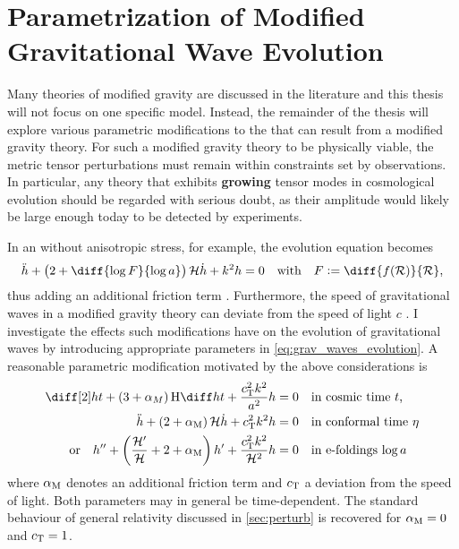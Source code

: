 \documentclass[parskip=half]{scrreprt}
\begin{document}



\chapter{Parametrization of Modified Gravitational Wave Evolution}

Many theories of modified gravity are discussed in the literature  and this thesis will not focus on one specific model. Instead, the remainder of the thesis will explore various parametric modifications to the  that can result from a modified gravity theory. For such a modified gravity theory to be physically viable, the metric tensor perturbations must remain within constraints set by observations. In particular, any theory that exhibits \textbf{growing} tensor modes in cosmological evolution should be regarded with serious doubt, as their amplitude would likely be large enough today to be detected by experiments.

In an  without anisotropic stress, for example, the evolution equation becomes
\begin{equation}
	\ddconf{h} + \del{2 + \diff{\log{F}}{\efold}} \Hconf \dconf{h} + k^2 h = 0 \quad \text{with} \quad F \defeq \diff{f(\Rscal)}{\Rscal} \eqpunct{,}
\end{equation}
thus adding an additional friction term \citep{Xu2015}. Furthermore, the speed of gravitational waves in a modified gravity theory can deviate from the speed of light \(c\) \citep{Amendola2014,Raveri2014}. I investigate the effects such modifications have on the evolution of gravitational waves by introducing appropriate parameters in \eqref{eq:grav_waves_evolution}. A reasonable parametric modification motivated by the above considerations is
\begin{subequations}\label{eq:evolution_friction}
\begin{align}
	\ddt{h} + \del{3 + \alpha_M} \Hcosm \dt{h} + \frac{\cT^2 k^2}{a^2} h &= 0 \quad \text{in cosmic time \(t\),} \\
	\ddconf{h} + \del{2 + \alphaM} \Hconf \dconf{h} + \cT^2 k^2 h &= 0 \quad \text{in conformal time \(\conft\)} \\
    \text{or} \quad \ddefold{h} + \del{\frac{\defold{\Hconf}}{\Hconf} + 2 + \alphaM} \defold{h} + \frac{\cT^2 k^2}{\Hconf^2} h &= 0 \quad \text{in e-foldings \(\efold\)}
\end{align}
\end{subequations}
where \(\alpha_\mathrm{M}\) denotes an additional friction term and \(c_\mathrm{T}\) a deviation from the speed of light. Both parameters may in general be time-dependent. The standard behaviour of general relativity discussed in \autoref{sec:perturb} is recovered for \(\alpha_\mathrm{M}=0\) and \(c_\mathrm{T}=1\).
\end{document}
